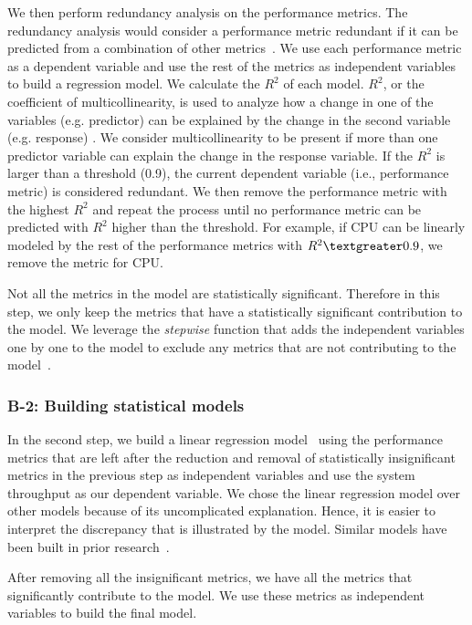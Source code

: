 \documentclass[smallextended]{svjour3}       %
\begin{document}
We then perform redundancy analysis on the performance metrics. The redundancy analysis would consider a performance metric redundant if it can be predicted from a combination of other metrics~\cite{harrell2001regression}. We use each performance metric as a dependent variable and use the rest of the metrics as independent variables to build a regression model. We calculate the $R^2$ of each model. $R^2$, or the coefficient of multicollinearity, is used to analyze how a change in one of the variables (e.g. predictor) can be explained by the change in the second variable (e.g. response) \cite{rsquare}. We consider multicollinearity to be present if more than one predictor variable can explain the change in the response variable. If the $R^2$ is larger than a threshold (0.9)\cite{Syer2016}, the current dependent variable (i.e., performance metric) is considered redundant. We then remove the performance metric with the highest $R^2$ and repeat the process until no performance metric can be predicted with $R^2$ higher than the threshold. For example, if CPU can be linearly modeled by the rest of the performance metrics with $R^2\textgreater0.9$, we remove the metric for CPU.

Not all the metrics in the model are statistically significant. Therefore in this step, we only keep the metrics that have a statistically significant contribution to the model. We leverage the \textit{stepwise} function that adds the independent variables one by one to the model to exclude any metrics that are not contributing to the model~\cite{RInAction}. 

\subsubsection{B-2: Building statistical models}

In the second step, we build a linear regression model~\cite{freedman2009statistical} using the performance metrics that are left after the reduction and removal of statistically insignificant metrics in the previous step as independent variables and use the system throughput as our dependent variable. We chose the linear regression model over other models because of its uncomplicated explanation. Hence, it is easier to interpret the discrepancy that is illustrated by the model. Similar models have been built in prior research~\cite{Cohen:2005:CIC:1095810.1095821,xiong2013vperfguard,Shang:2015:ADP:2668930.2688052}.

After removing all the insignificant metrics, we have all the metrics that significantly contribute to the model. We use these metrics as independent variables to build the final model.
\end{document}
